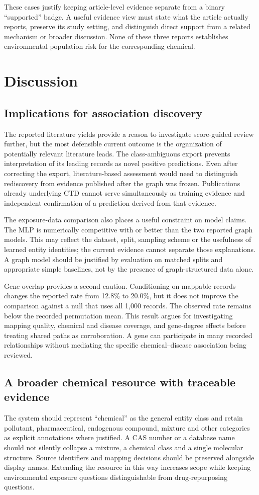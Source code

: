 These cases justify keeping article-level evidence separate from a binary ``supported'' badge. A useful evidence view must state what the article actually reports, preserve its study setting, and distinguish direct support from a related mechanism or broader discussion. None of these three reports establishes environmental population risk for the corresponding chemical.

\section{Discussion}
\subsection{Implications for association discovery}
The reported literature yields provide a reason to investigate score-guided review further, but the most defensible current outcome is the organization of potentially relevant literature leads. The class-ambiguous export prevents interpretation of its leading records as novel positive predictions. Even after correcting the export, literature-based assessment would need to distinguish rediscovery from evidence published after the graph was frozen. Publications already underlying CTD cannot serve simultaneously as training evidence and independent confirmation of a prediction derived from that evidence.

The exposure-data comparison also places a useful constraint on model claims. The MLP is numerically competitive with or better than the two reported graph models. This may reflect the dataset, split, sampling scheme or the usefulness of learned entity identities; the current evidence cannot separate those explanations. A graph model should be justified by evaluation on matched splits and appropriate simple baselines, not by the presence of graph-structured data alone.

Gene overlap provides a second caution. Conditioning on mappable records changes the reported rate from 12.8\% to 20.0\%, but it does not improve the comparison against a null that uses all 1,000 records. The observed rate remains below the recorded permutation mean. This result argues for investigating mapping quality, chemical and disease coverage, and gene-degree effects before treating shared paths as corroboration. A gene can participate in many recorded relationships without mediating the specific chemical--disease association being reviewed.

\subsection{A broader chemical resource with traceable evidence}
The system should represent ``chemical'' as the general entity class and retain pollutant, pharmaceutical, endogenous compound, mixture and other categories as explicit annotations where justified. A CAS number or a database name should not silently collapse a mixture, a chemical class and a single molecular structure. Source identifiers and mapping decisions should be preserved alongside display names. Extending the resource in this way increases scope while keeping environmental exposure questions distinguishable from drug-repurposing questions.

